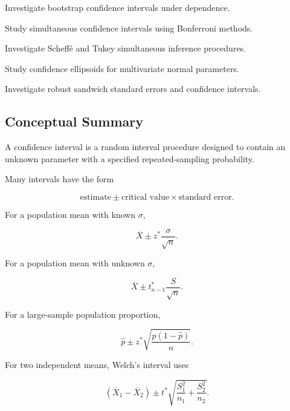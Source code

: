 \begin{exercise}[4]
Investigate bootstrap confidence intervals under dependence.
\end{exercise}

\begin{exercise}[4]
Study simultaneous confidence intervals using Bonferroni methods.
\end{exercise}

\begin{exercise}[4]
Investigate Scheff\'e and Tukey simultaneous inference procedures.
\end{exercise}

\begin{exercise}[4]
Study confidence ellipsoids for multivariate normal parameters.
\end{exercise}

\begin{exercise}[4]
Investigate robust sandwich standard errors and confidence intervals.
\end{exercise}

\subsection{Conceptual Summary}
\label{subsec:confidence-interval-summary}

A confidence interval is a random interval procedure designed to contain
an unknown parameter with a specified repeated-sampling probability.

Many intervals have the form

\[
\boxed{
\text{estimate}
\pm
\text{critical value}
\times
\text{standard error}.
}
\]

For a population mean with known \(\sigma\),

\[
\boxed{
\overline{X}
\pm
z^*
\frac{\sigma}{\sqrt{n}}.
}
\]

For a population mean with unknown \(\sigma\),

\[
\boxed{
\overline{X}
\pm
t^*_{n-1}
\frac{S}{\sqrt{n}}.
}
\]

For a large-sample population proportion,

\[
\boxed{
\widehat{p}
\pm
z^*
\sqrt{
\frac{
\widehat{p}(1-\widehat{p})
}{n}
}.
}
\]

For two independent means, Welch's interval uses

\[
\boxed{
(\overline{X}_1-\overline{X}_2)
\pm
t^*
\sqrt{
\frac{
S_1^2
}{
n_1
}
+
\frac{
S_2^2
}{
n_2
}
}.
}
\]

